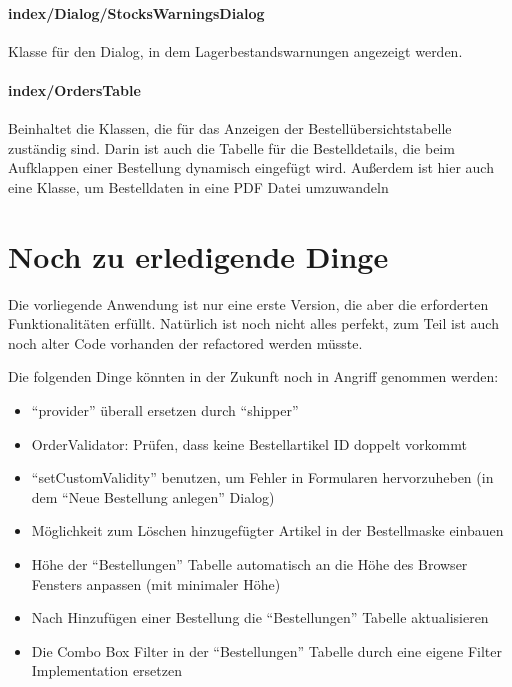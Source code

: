 \documentclass[12pt,pdftex,parskip=half]{scrartcl}
\begin{document}
        \paragraph{index/Dialog/StocksWarningsDialog}
        Klasse für den Dialog, in dem Lagerbestandswarnungen angezeigt werden.

        \paragraph{index/OrdersTable}
        Beinhaltet die Klassen, die für das Anzeigen der Bestellübersichtstabelle zuständig sind.
        Darin ist auch die Tabelle für die Bestelldetails, die beim Aufklappen einer Bestellung dynamisch eingefügt wird.
        Außerdem ist hier auch eine Klasse, um Bestelldaten in eine PDF Datei umzuwandeln


    \newpage


\section{Noch zu erledigende Dinge}

Die vorliegende Anwendung ist nur eine erste Version, die aber die erforderten Funktionalitäten erfüllt. Natürlich ist noch nicht alles perfekt, zum Teil ist auch noch alter Code vorhanden der refactored werden müsste.

Die folgenden Dinge könnten in der Zukunft noch in Angriff genommen werden:

\begin{itemize}
    \item "`provider"' überall ersetzen durch "`shipper"'
    \item OrderValidator: Prüfen, dass keine Bestellartikel ID doppelt vorkommt
    \item "`setCustomValidity"' benutzen, um Fehler in Formularen hervorzuheben (in dem "`Neue Bestellung anlegen"' Dialog)
    \item Möglichkeit zum Löschen hinzugefügter Artikel in der Bestellmaske einbauen
    \item Höhe der "`Bestellungen"' Tabelle automatisch an die Höhe des Browser Fensters anpassen (mit minimaler Höhe)
    \item Nach Hinzufügen einer Bestellung die "`Bestellungen"' Tabelle aktualisieren
    \item Die Combo Box Filter in der "`Bestellungen"' Tabelle durch eine eigene Filter Implementation ersetzen
\end{itemize}
\end{document}
